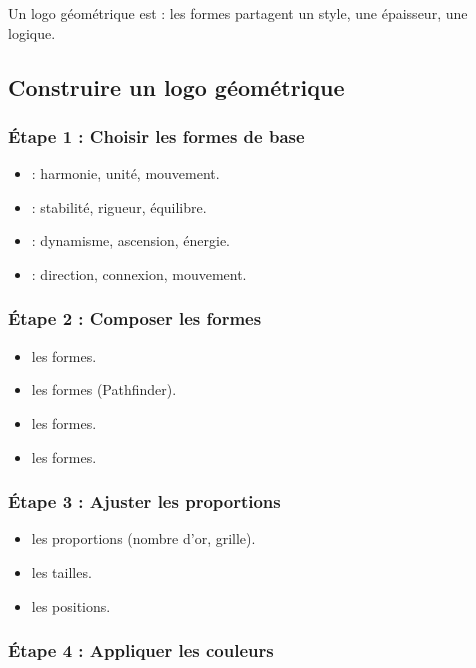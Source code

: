 Un logo géométrique est  : les formes partagent un style, une épaisseur, une logique.

\subsection{Construire un logo géométrique}

\subsubsection{Étape 1 : Choisir les formes de base}

\begin{itemize}
    \item {} : harmonie, unité, mouvement.
    \item {} : stabilité, rigueur, équilibre.
    \item {} : dynamisme, ascension, énergie.
    \item {} : direction, connexion, mouvement.
\end{itemize}

\subsubsection{Étape 2 : Composer les formes}

\begin{itemize}
    \item {} les formes.
    \item {} les formes (Pathfinder).
    \item {} les formes.
    \item {} les formes.
\end{itemize}

\subsubsection{Étape 3 : Ajuster les proportions}

\begin{itemize}
    \item {} les proportions (nombre d'or, grille).
    \item {} les tailles.
    \item {} les positions.
\end{itemize}

\subsubsection{Étape 4 : Appliquer les couleurs}

